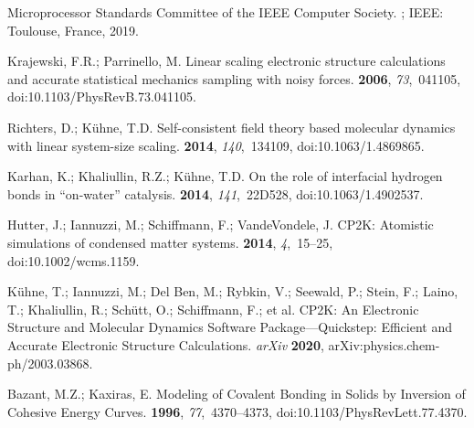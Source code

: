 \documentclass[computation,article,accept,moreauthors,pdftex]{Definitions/mdpi}
\begin{document}
\begin{thebibliography}{999}
{Microprocessor Standards Committee of the IEEE Computer Society}.
; IEEE: Toulouse, France, 2019.

Krajewski, F.R.; Parrinello, M.
\newblock Linear scaling electronic structure calculations and accurate
 statistical mechanics sampling with noisy forces.
 {\bf 2006}, {\em 73},~041105, doi:10.1103/PhysRevB.73.041105.

Richters, D.; K\"uhne, T.D.
\newblock Self-consistent field theory based molecular dynamics with linear
 system-size scaling.
 {\bf 2014}, {\em 140},~134109, doi:10.1063/1.4869865.

Karhan, K.; Khaliullin, R.Z.; K\"uhne, T.D.
\newblock On the role of interfacial hydrogen bonds in ``on-water'' catalysis.
 {\bf 2014}, {\em 141},~22D528, doi:10.1063/1.4902537.

Hutter, J.; Iannuzzi, M.; Schiffmann, F.; VandeVondele, J.
\newblock CP2K: Atomistic simulations of condensed matter systems.
 {\bf 2014}, {\em 4},~15--25, doi:10.1002/wcms.1159.

K\"uhne, T.; Iannuzzi, M.; {Del Ben}, M.; Rybkin, V.; Seewald, P.; Stein, F.;
 Laino, T.; Khaliullin, R.; Sch\"utt, O.; Schiffmann, F.; et al.
\newblock CP2K: An Electronic Structure and Molecular Dynamics Software Package---Quickstep: Efficient and Accurate Electronic Structure Calculations. \emph{arXiv} {\bf
 2020}, 
arXiv:physics.chem-ph/2003.03868.

Bazant, M.Z.; Kaxiras, E.
\newblock Modeling of Covalent Bonding in Solids by Inversion of Cohesive
 Energy Curves.
 {\bf 1996}, {\em 77},~4370--4373, doi:10.1103/PhysRevLett.77.4370.


\end{thebibliography}
\end{document}
